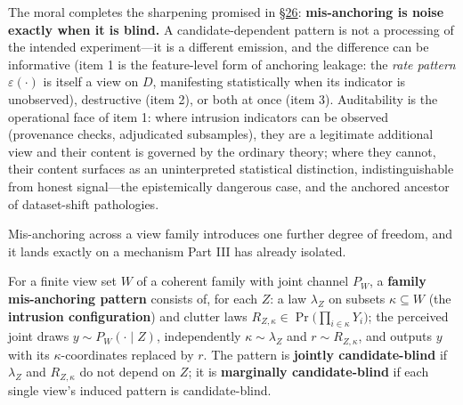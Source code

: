 The moral completes the sharpening promised in \hyperlink{sec:26}{§26}: \textbf{mis-anchoring is noise exactly when it is blind.} A candidate-dependent pattern is not a processing of the intended experiment---\hspace{0pt}it is a different emission, and the difference can be informative (item 1 is the feature-level form of anchoring leakage: the \emph{rate pattern} \(\varepsilon(\cdot)\) is itself a view on \(D\), manifesting statistically when its indicator is unobserved), destructive (item 2), or both at once (item 3). Auditability is the operational face of item 1: where intrusion indicators can be observed (provenance checks, adjudicated subsamples), they are a legitimate additional view and their content is governed by the ordinary theory; where they cannot, their content surfaces as an uninterpreted statistical distinction, indistinguishable from honest signal---\hspace{0pt}the epistemically dangerous case, and the anchored ancestor of dataset-shift pathologies.


Mis-anchoring across a view family introduces one further degree of freedom, and it lands exactly on a mechanism Part III has already isolated.

\begin{thmdef}

For a finite view set \(W\) of a coherent family with joint channel \(P_W\), a \textbf{family mis-anchoring pattern} consists of, for each \(Z\): a law \(\lambda_Z\) on subsets \(\kappa \subseteq W\) (the \textbf{intrusion configuration}) and clutter laws \(R_{Z, \kappa} \in \Pr\big(\prod_{i \in \kappa} Y_i\big)\); the perceived joint draws \(y \sim P_W(\cdot \mid Z)\), independently \(\kappa \sim \lambda_Z\) and \(r \sim R_{Z,\kappa}\), and outputs \(y\) with its \(\kappa\)-coordinates replaced by \(r\). The pattern is \textbf{jointly candidate-blind} if \(\lambda_Z\) and \(R_{Z,\kappa}\) do not depend on \(Z\); it is \textbf{marginally candidate-blind} if each single view's induced pattern is candidate-blind.
\end{thmdef}

